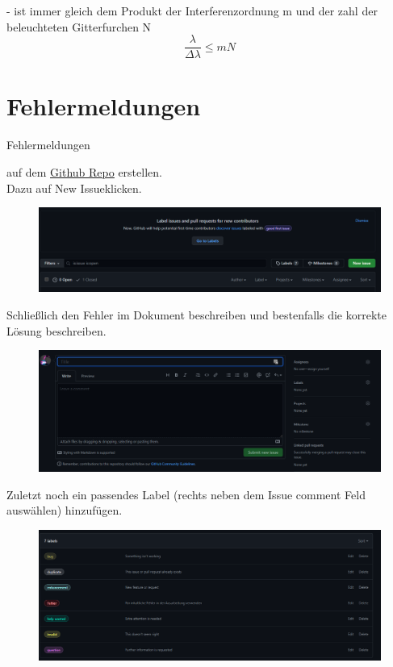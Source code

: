 \documentclass[a4paper, 11pt, parskip=half]{scrartcl}
\begin{document}
- ist immer gleich dem Produkt der Interferenzordnung m und der zahl der beleuchteten Gitterfurchen N
\begin{equation}
\frac{\lambda}{\Delta \lambda} \leq mN
\end{equation}
\newpage


\section{Fehlermeldungen}
\label{sec:Fehler}
\hypertarget{Fehler}{Fehlermeldungen} auf dem \href{https://github.com/etschgi1/Ex2_Fragen/issues}{\underline{Github Repo}} erstellen.\\
Dazu auf \glqq New Issue\grqq klicken.
\begin{figure}[H]
    \centering
    \includegraphics[width=15cm]{image/Misc/Issues.png}
\end{figure}
Schließlich den Fehler im Dokument beschreiben und bestenfalls die korrekte Lösung beschreiben. 
\begin{figure}[H]
    \centering
    \includegraphics[width=15cm]{image/Misc/Issue_erstellen.png}
\end{figure}
Zuletzt noch ein passendes Label (rechts neben dem Issue comment Feld auswählen) hinzufügen.
\begin{figure}[H]
    \centering
    \includegraphics[width=15cm]{image/Misc/Labels.png}
\end{figure}
\end{document}
